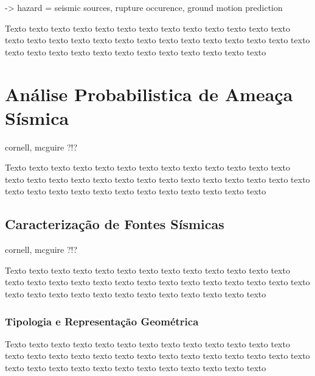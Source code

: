-> hazard = seismic sources, 
			rupture occurence, 
			ground motion prediction 



Texto texto texto texto texto texto texto texto texto texto texto texto texto
texto texto texto texto texto texto texto texto texto texto texto texto texto
texto texto texto texto texto texto texto texto texto texto texto texto texto



\section{Análise Probabilistica de Ameaça Sísmica}
\label{sec:psha}


cornell, mcguire ?!?


Texto texto texto texto texto texto texto texto texto texto texto texto texto
texto texto texto texto texto texto texto texto texto texto texto texto texto
texto texto texto texto texto texto texto texto texto texto texto texto texto



\subsection{Caracterização de Fontes Sísmicas}
\label{sec:fontes}

cornell, mcguire ?!?


Texto texto texto texto texto texto texto texto texto texto texto texto texto
texto texto texto texto texto texto texto texto texto texto texto texto texto
texto texto texto texto texto texto texto texto texto texto texto texto texto



\subsubsection{Tipologia e Representação Geométrica}
\label{sec:fontes_tipologia}


\label{sec:fonte_falha_complexa}


Texto texto texto texto texto texto texto texto texto texto texto texto texto
texto texto texto texto texto texto texto texto texto texto texto texto texto
texto texto texto texto texto texto texto texto texto texto texto texto texto



